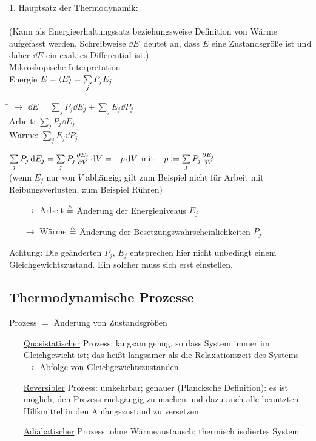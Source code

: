 \uline{1. Hauptsatz der Thermodynamik}:\\
\\
(Kann als Energieerhaltungssatz beziehungsweise Definition von Wärme aufgefasst werden. Schreibweise \glqq$\dd{E}$\grqq\ deutet an, dass $E$ eine Zustandsgröße ist und daher $\dd{E}$ ein exaktes Differential ist.)\\
\uline{Mikroskopische Interpretation}\\
Energie $E = \left\langle E \right\rangle = \sum\limits_j P_j E_j$
\begin{tabbing}
\hspace{4em} \= \kill
$\rightarrow$\> $\dd{E} = \sum\limits_j P_j \dd{E_j} + \sum\limits_j E_j \dd{P_j}$\\
Arbeit: \> $\sum\limits_j P_j \dd{E_j}$\\
Wärme: \> $\sum\limits_jE_j \dd{P_j}$
\end{tabbing}
$\sum\limits_j P_j \,\text d{E_j} = \sum\limits_j P_j \frac{\partial E_j}{\partial V} \,\text d{V} = - p \,\text d{V}$ mit $-p \vcentcolon = \sum\limits_j P_j \frac{\partial E_j}{\partial V}$\\
(wenn $E_j$ nur von $V$ abhängig; gilt zum Beispiel nicht für Arbeit mit Reibungsverlusten, zum Beispiel Rühren)
\begin{itemize}[align=left, labelwidth=6em, labelsep=1ex, labelindent=0pt, leftmargin=++, listparindent=\leftmargin]
\item[$\rightarrow$ Arbeit] $\stackrel{\wedge}{=}$ Änderung der Energieniveaus $E_j$
\item[$\rightarrow$ Wärme] $\stackrel{\wedge}{=}$ Änderung der Besetzungswahrscheinlichkeiten $P_j$
\end{itemize}
Achtung: Die geänderten $P_j$, $E_j$ entsprechen hier nicht unbedingt einem Gleichgewichtszustand. Ein solcher muss sich erst einstellen.

\subsection{Thermodynamische Prozesse}
Prozess $=$ Änderung von Zustandsgrößen

\begin{itemize}[align=left, labelwidth=, labelsep=1ex, labelindent=0pt, leftmargin=++, listparindent=\leftmargin]
\item[\uline{Quasistatischer} Prozess:] langsam genug, so dass System immer im Gleichgewicht ist; das heißt langsamer als die Relaxationszeit des Systems\\
$\rightarrow$ Abfolge von Gleichgewichtszuständen
\item[\uline{Reversibler} Prozess:] umkehrbar; genauer (Plancksche Definition): es ist möglich, den Prozess rück\-gängig zu machen und dazu auch alle benutzten Hilfsmittel in den Anfangszustand zu versetzen.
\item[\uline{Adiabatischer} Prozess:] ohne Wärmeaustausch; thermisch isoliertes System
\end{itemize}

